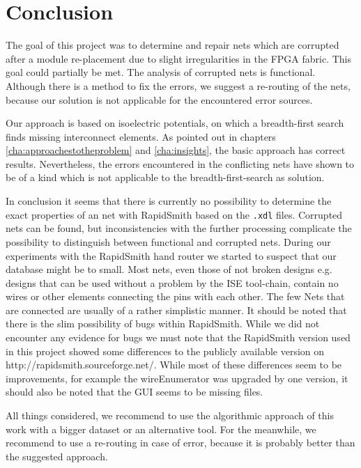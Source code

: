 \chapter{Conclusion}
\label{cha:conclusion}

The goal of this project was to determine and repair nets which are corrupted after a module re-placement due to slight irregularities in the FPGA fabric. This goal could partially be met. The analysis of corrupted nets is functional. Although there is a method to fix the errors, we suggest a re-routing of the nets, because our solution is not applicable for the encountered error sources.

Our approach is based on isoelectric potentials, on which a breadth-first search finds missing interconnect elements. As pointed out in chapters \ref{cha:approachestotheproblem} and \ref{cha:insights}, the basic approach has correct results. Nevertheless, the errors encountered in the conflicting nets have shown to be of a kind which is not applicable to the breadth-first-search as solution. 

In conclusion it seems that there is currently no possibility to determine the exact properties of an net with RapidSmith based on the \texttt{.xdl} files. Corrupted nets can be found, but inconsistencies with the further processing complicate the possibility to distinguish between functional and corrupted nets.
During our experiments with the RapidSmith hand router we started to suspect that our database might be to small. Most nets, even those of not broken designs e.g. designs that can be used without a problem by the ISE tool-chain, contain no wires or other elements connecting the pins with each other. The few Nets that are connected are usually of a rather simplistic manner.
It should be noted that there is the slim possibility of bugs within RapidSmith. While we did not encounter any evidence for bugs we must note that the RapidSmith version used in this project showed some differences to the publicly available version on http://rapidsmith.sourceforge.net/. While most of these differences seem to be improvements, for example the wireEnumerator was upgraded by one version, it should also be noted that the GUI seems to be missing files.

All things considered, we recommend to use the algorithmic approach of this work with a bigger dataset or an alternative tool. For the meanwhile, we recommend to use a re-routing in case of error, because it is probably better than the suggested approach.


